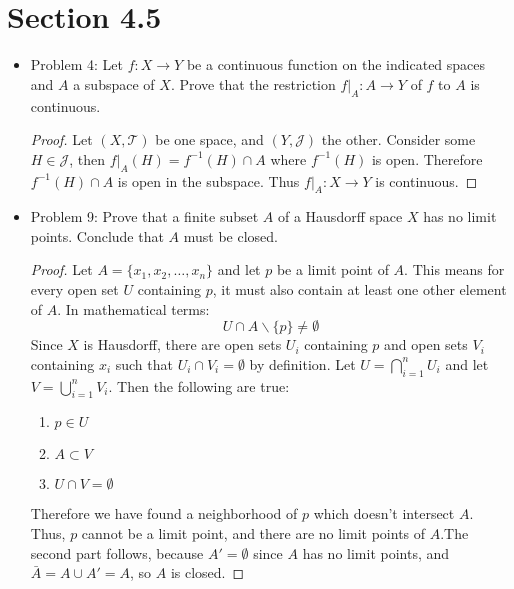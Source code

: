 \documentclass[hidelinks,12pt]{article}
\theoremstyle{definition}
\newcommand{\T}{\mathcal T}
\begin{document}
\section{Section 4.5}
\begin{itemize}
    \item Problem 4: Let $f:X\to Y$ be a continuous function on the indicated spaces and $A$ a subspace of $X$. Prove that the restriction $f|_A:A\to Y$ of $f$ to $A$ is continuous.\begin{proof} Let $(X,\T)$ be one space, and $(Y,\mathcal{J})$ the other. Consider some $H\in\mathcal{J}$, then $f|_A(H)=f^{-1}(H)\cap A$ where $f^{-1}(H)$ is open. Therefore $f^{-1}(H)\cap A$ is open in the subspace. Thus $f|_A:X\to Y$ is continuous.
    \end{proof}
    \item Problem 9: Prove that a finite subset $A$ of a Hausdorff space $X$ has no limit points. Conclude that $A$ must be closed.\begin{proof} Let $A=\{x_1,x_2,\dots,x_n\}$ and let $p$ be a limit point of $A$. This means for every open set $U$ containing $p$, it must also contain at least one other element of $A$. In mathematical terms: $$U\cap A\backslash\{p\}\neq\emptyset$$ Since $X$ is Hausdorff, there are open sets $U_i$ containing $p$ and open sets $V_i$ containing $x_i$ such that $U_i\cap V_i=\emptyset$ by definition. Let $U=\bigcap_{i=1}^nU_i$ and let $V=\bigcup_{i=1}^nV_i$. Then the following are true:\begin{enumerate}
        \item $p\in U$
        \item $A\subset V$
        \item $U\cap V=\emptyset$
    \end{enumerate}
    Therefore we have found a neighborhood of $p$ which doesn't intersect $A$. Thus, $p$ cannot be a limit point, and there are no limit points of $A$.\newline The second part follows, because $A'=\emptyset$ since $A$ has no limit points, and $\bar{A}=A\cup A'=A$, so $A$ is closed.
    \end{proof}
\end{itemize}
\end{document}
